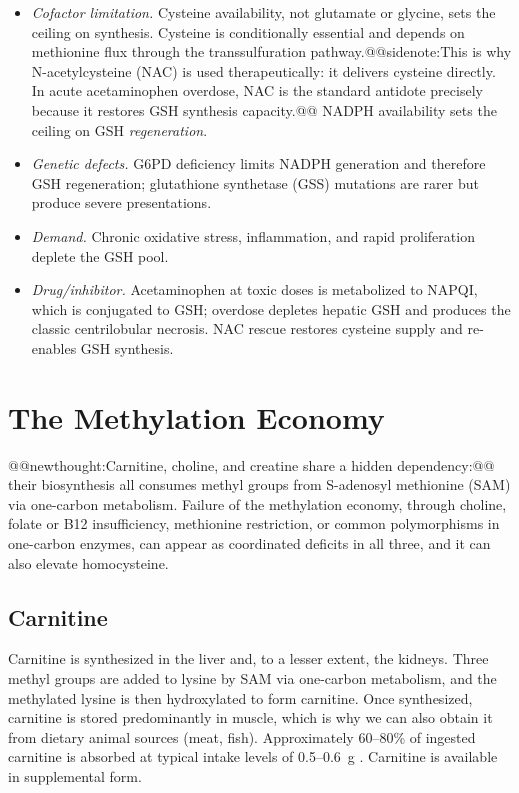 \documentclass{tufte-handout}
\makeatletter
\def\newthought#1{@@newthought:#1@@}
\def\sidenote#1{@@sidenote:#1@@}
\makeatother
\begin{document}
\begin{itemize}
\item \emph{Cofactor limitation.} Cysteine availability, not glutamate or glycine, sets the ceiling on synthesis. Cysteine is conditionally essential and depends on methionine flux through the transsulfuration pathway.\sidenote{This is why N-acetylcysteine (NAC)\nomenclature{NAC}{N-Acetylcysteine} is used therapeutically: it delivers cysteine directly. In acute acetaminophen\index{Drugs!Acetaminophen} overdose, NAC is the standard antidote precisely because it restores GSH synthesis capacity.} NADPH availability sets the ceiling on GSH \emph{regeneration}.
\item \emph{Genetic defects.} G6PD deficiency limits NADPH generation and therefore GSH regeneration; glutathione synthetase (GSS) mutations are rarer but produce severe presentations.
\item \emph{Demand.} Chronic oxidative stress, inflammation, and rapid proliferation deplete the GSH pool.
\item \emph{Drug/inhibitor.} Acetaminophen at toxic doses is metabolized to NAPQI, which is conjugated to GSH; overdose depletes hepatic GSH and produces the classic centrilobular necrosis. NAC rescue restores cysteine supply and re-enables GSH synthesis.
\end{itemize}

\section{The Methylation Economy}\label{sec:methylation-economy}
\newthought{Carnitine, choline, and creatine share a hidden dependency:} their biosynthesis all consumes methyl groups from S-adenosyl methionine (SAM) via one-carbon metabolism. Failure of the methylation economy, through choline, folate or B12 insufficiency, methionine restriction, or common polymorphisms in one-carbon enzymes, can appear as coordinated deficits in all three, and it can also elevate homocysteine.

\subsection{Carnitine}
Carnitine is synthesized in the liver and, to a lesser extent, the kidneys. Three methyl groups are added to lysine by SAM via one-carbon metabolism, and the methylated lysine is then hydroxylated to form carnitine. Once synthesized, carnitine is stored predominantly in muscle, which is why we can also obtain it from dietary animal sources (meat, fish). Approximately 60--80\% of ingested carnitine is absorbed at typical intake levels of 0.5--0.6~g \citep{reboucheKineticsPharmacokineticsRegulation2004}. Carnitine is available in supplemental form.
\end{document}
